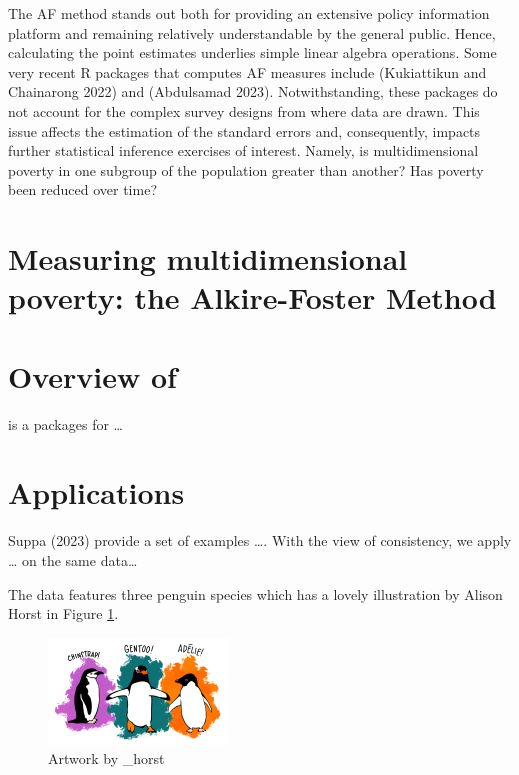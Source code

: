 The AF method stands out both for providing an extensive policy information platform and remaining relatively understandable by the general public. Hence, calculating the point estimates underlies simple linear algebra operations. Some very recent R packages that computes AF measures include  (Kukiattikun and Chainarong 2022) and  (Abdulsamad 2023). Notwithstanding, these packages do not account for the complex survey designs from where data are drawn. This issue affects the estimation of the standard errors and, consequently, impacts further statistical inference exercises of interest. Namely, is multidimensional poverty in one subgroup of the population greater than another? Has poverty been reduced over time?

\hypertarget{measuring-multidimensional-poverty-the-alkire-foster-method}{%
\section{Measuring multidimensional poverty: the Alkire-Foster Method}\label{measuring-multidimensional-poverty-the-alkire-foster-method}}

\hypertarget{overview-of}{%
\section{\texorpdfstring{Overview of }{Overview of }}\label{overview-of}}

 is a packages for \ldots{}

\hypertarget{applications}{%
\section{Applications}\label{applications}}

Suppa (2023) provide a set of examples \ldots. With the view of consistency, we apply \ldots{} on the same data\ldots{}

The  data features three penguin species which has a lovely illustration by Alison Horst in Figure \ref{fig:penguins-alison}.

\begin{figure}
\includegraphics[width=1\linewidth,height=0.3\textheight]{penguins} \caption{Artwork by \@allison\_horst}\label{fig:penguins-alison}
\end{figure}

